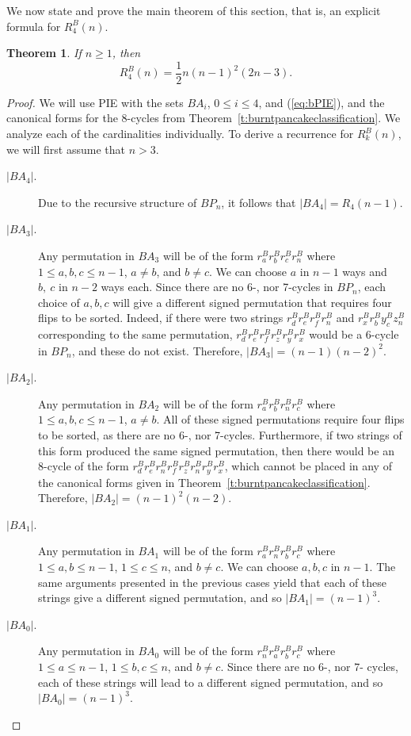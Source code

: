 \documentclass[final]{dmtcs-episciences}
\numberwithin{equation}{section}
\newtheorem{thm}{Theorem}[section]
\begin{document}
We now state and prove the main theorem of this section, that is, an explicit formula for $R^B_4(n)$.

\begin{thm}\label{t:bsnk=4} If $n\geq1$, then
\[
    R_4^B(n) = \frac{1}{2} n(n-1)^2(2n-3).
\]
\end{thm}
\begin{proof} We will use PIE with the sets $BA_i$, $0\leq i\leq 4$, and (\ref{eq:bPIE}), and the canonical forms for the 8-cycles from Theorem~\ref{t:burntpancakeclassification}. We analyze each of the cardinalities individually. To derive a recurrence for $R^B_k(n)$, we will first assume that $n>3$.
\begin{description}
\item[$|BA_4|$.] Due to the recursive structure of $BP_n$, it follows that $|BA_4| = R_4(n-1)$.
\item[$|BA_3|$.] Any permutation in $BA_3$ will be of the form $r^B_ar^B_br^B_cr^B_n$ where $1 \leq a,b,c \leq n-1$, $a\neq b$, and $b\neq c$. We can choose $a$ in $n-1$ ways and $b, \ c$ in $n-2$ ways each. Since there are no 6-, nor 7-cycles in $BP_n$, each choice of $a,b,c$ will give a different signed permutation that requires four flips to be sorted. Indeed, if there were two strings $r^B_dr^B_er^B_fr^B_n$ and $r^B_xr^B_by^B_cz^B_n$ corresponding to the same permutation, $r^B_dr^B_er^B_fr^B_zr^B_yr^B_x$ would be a 6-cycle in $BP_n$, and these do not exist. Therefore, $|BA_3|=(n-1)(n-2)^2$.
\item[$|BA_2|$.] Any permutation in $BA_2$ will be of the form $r^B_ar^B_br^B_nr^B_c$ where $1 \leq a,b,c \leq n-1$, $a\neq b$. All of these signed permutations require four flips to be sorted, as there are no 6-, nor 7-cycles. Furthermore, if two strings of this form produced the same signed permutation, then there would be an 8-cycle of the form $r^B_d r^B_e r^B_n r^B_f r^B_z r^B_n r^B_y r^B_x$, which cannot be placed in any of the canonical forms given in Theorem~\ref{t:burntpancakeclassification}. Therefore, $|BA_2|=(n-1)^2(n-2)$.
\item[$|BA_1|$.] Any permutation in $BA_1$ will be of the form $r^B_a r^B_n r^B_b r^B_c$ where $1 \leq a,b \leq n-1$, $1 \leq c \leq n$, and $b\neq c$. We can choose $a, b, c$ in $n-1$. The same arguments presented in the previous cases yield that each of these strings give a different signed permutation, and so $|BA_1|=(n-1)^3$.  
\item[$|BA_0|$.] Any permutation in $BA_0$ will be of the form $r^B_n r^B_a r^B_b r^B_c$ where $1\leq a\leq n-1$, $1 \leq b,c \leq n$, and $b\neq c$. Since there are no 6-, nor 7- cycles, each of these strings will lead to a different signed permutation, and so $|BA_0|=(n-1)^3$. 

\end{description}
\end{proof}
\end{document}
